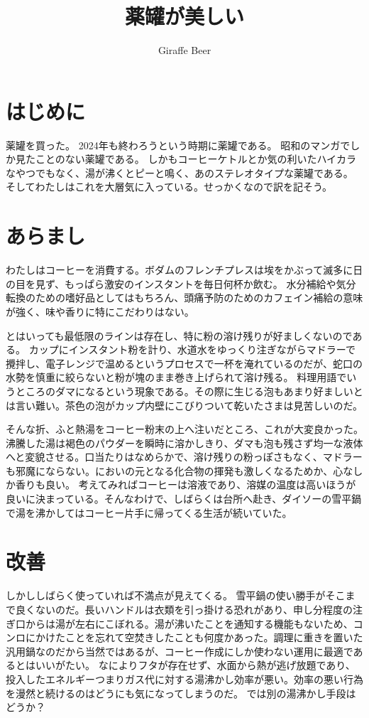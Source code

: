\documentclass{sokuten}
\title{薬罐が美しい}
\author{Giraffe Beer}
\date{}
\begin{document}
\maketitle

\section{はじめに}
薬罐を買った。
2024年も終わろうという時期に薬罐である。
昭和のマンガでしか見たことのない薬罐である。
しかもコーヒーケトルとか気の利いたハイカラなやつでもなく、湯が沸くとピーと鳴く、あのステレオタイプな薬罐である。
そしてわたしはこれを大層気に入っている。せっかくなので訳を記そう。

\section{あらまし}
わたしはコーヒーを消費する。ボダムのフレンチプレスは埃をかぶって滅多に日の目を見ず、もっぱら激安のインスタントを毎日何杯か飲む。
水分補給や気分転換のための嗜好品としてはもちろん、頭痛予防のためのカフェイン補給の意味が強く、味や香りに特にこだわりはない。

とはいっても最低限のラインは存在し、特に粉の溶け残りが好ましくないのである。
カップにインスタント粉を計り、水道水をゆっくり注ぎながらマドラーで攪拌し、電子レンジで温めるというプロセスで一杯を淹れているのだが、蛇口の水勢を慎重に絞らないと粉が塊のまま巻き上げられて溶け残る。
料理用語でいうところのダマになるという現象である。その際に生じる泡もあまり好ましいとは言い難い。茶色の泡がカップ内壁にこびりついて乾いたさまは見苦しいのだ。

そんな折、ふと熱湯をコーヒー粉末の上へ注いだところ、これが大変良かった。沸騰した湯は褐色のパウダーを瞬時に溶かしきり、ダマも泡も残さず均一な液体へと変貌させる。口当たりはなめらかで、溶け残りの粉っぽさもなく、マドラーも邪魔にならない。においの元となる化合物の揮発も激しくなるためか、心なしか香りも良い。
考えてみればコーヒーは溶液であり、溶媒の温度は高いほうが良いに決まっている。そんなわけで、しばらくは台所へ赴き、ダイソーの雪平鍋で湯を沸かしてはコーヒー片手に帰ってくる生活が続いていた。

\section{改善}
しかししばらく使っていれば不満点が見えてくる。
雪平鍋の使い勝手がそこまで良くないのだ。長いハンドルは衣類を引っ掛ける恐れがあり、申し分程度の注ぎ口からは湯が左右にこぼれる。湯が沸いたことを通知する機能もないため、コンロにかけたことを忘れて空焚きしたことも何度かあった。調理に重きを置いた汎用鍋なのだから当然ではあるが、コーヒー作成にしか使わない運用に最適であるとはいいがたい。
なによりフタが存在せず、水面から熱が逃げ放題であり、投入したエネルギーつまりガス代に対する湯沸かし効率が悪い。効率の悪い行為を漫然と続けるのはどうにも気になってしまうのだ。
では別の湯沸かし手段はどうか？
\end{document}
